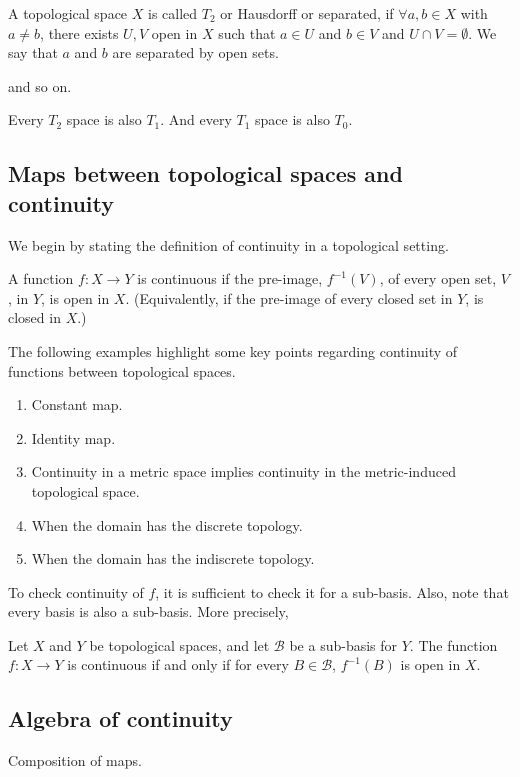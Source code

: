 \begin{ndfn}[$T_{2}$ spaces]
  A topological space $X$ is called $T_2$ or Hausdorff or separated, if $\forall a, b \in X$ with $a \neq b$, there exists $U, V$ open in $X$ such that $a \in U$ and $b \in V$ and $U \cap V = \emptyset$. We say that $a$ and $b$ are separated by open sets.
\end{ndfn}
and so on.

\begin{nlemma}
  Every $T_2$ space is also $T_1$. And every $T_1$ space is also $T_0$.
\end{nlemma}

\subsection{Maps between topological spaces and continuity}
We begin by stating the definition of continuity in a topological setting.
\begin{ndfn}
  A function $f : X \to Y$ is continuous if the pre-image, $f^{-1}(V)$, of every open set, $V$, in $Y$, is open in $X$. (Equivalently, if the pre-image of every closed set in $Y$, is closed in $X$.)
\end{ndfn}

\begin{negg}
  The following examples highlight some key points regarding continuity of functions between topological spaces.
  \begin{enumerate}
  \item Constant map.
  \item Identity map.
  \item Continuity in a metric space implies continuity in the metric-induced topological space.
  \item When the domain has the discrete topology.
  \item When the domain has the indiscrete topology.
  \end{enumerate}
\end{negg}

To check continuity of $f$, it is sufficient to check it for a sub-basis. Also, note that every basis is also a sub-basis. More precisely,
\begin{nlemma}
  Let $X$ and $Y$ be topological spaces, and let $\mathcal{B}$ be a sub-basis for $Y$. The function $f: X \to Y$ is continuous if and only if for every $B \in \mathcal{B}$, $f^{-1}(B)$ is open in $X$.
\end{nlemma}

\subsection{Algebra of continuity}
Composition of maps.

